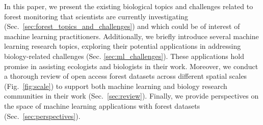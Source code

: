 \documentclass{CUP-JNL-DTM}%
\theoremstyle{definition}
\numberwithin{equation}{section}
\begin{document}
In this paper, we present the existing biological topics and challenges related to forest monitoring that scientists are currently investigating (Sec.~\ref{sec:forest_topics_and_challenges}) and which could be of interest of machine learning practitioners. 
Additionally, we briefly introduce several machine learning research topics, exploring their potential applications in addressing biology-related challenges (Sec. \ref{sec:ml_challenges}). These applications hold promise in assisting ecologists and biologists in their work.
Moreover, we conduct a thorough review of open access forest datasets across different spatial scales (Fig.~\ref{fig:scale}) to support both machine learning and biology research communities in their work (Sec.~\ref{sec:review}). 
Finally, we provide perspectives on the space of machine learning applications with forest datasets (Sec.~\ref{sec:perspectives}).




\end{document}

